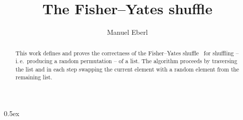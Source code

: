 \documentclass[11pt,a4paper]{article}
\begin{document}
\title{The Fisher--Yates shuffle}
\author{Manuel Eberl}
\maketitle

\begin{abstract}
This work defines and proves the correctness of the Fisher--Yates shuffle~\cite{fisheryates,taocp,wikipedia} for shuffling -- i.\,e.\ producing a random permutation -- of a list. 
The algorithm proceeds by traversing the list and in each step swapping the current element with a random element from the remaining list.
\end{abstract}

\tableofcontents

\parindent 0pt\parskip 0.5ex

\newpage




\end{document}

